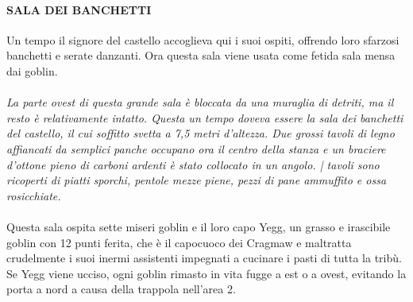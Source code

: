 \documentclass{article}
\begin{document}
\paragraph{SALA DEI BANCHETTI}
Un tempo il signore del castello accoglieva qui i suoi ospiti,
offrendo loro sfarzosi banchetti e serate danzanti. Ora questa
sala viene usata come fetida sala mensa dai goblin. \\
\\
\textit{La parte ovest di questa grande sala è bloccata da una muraglia
di detriti, ma il resto è relativamente intatto. Questa un tempo
doveva essere la sala dei banchetti del castello, il cui soffitto
svetta a 7,5 metri d’altezza. Due grossi tavoli di legno affiancati
da semplici panche occupano ora il centro della stanza e un
braciere d’ottone pieno di carboni ardenti è stato collocato
in un angolo. | tavoli sono ricoperti di piatti sporchi, pentole
mezze piene, pezzi di pane ammuffito e ossa rosicchiate.}\\
\\
Questa sala ospita sette miseri goblin e il loro capo Yegg,
un grasso e irascibile goblin con 12 punti ferita, che è il
capocuoco dei Cragmaw e maltratta crudelmente i suoi
inermi assistenti impegnati a cucinare i pasti di tutta la
tribù. Se Yegg viene ucciso, ogni goblin rimasto in vita
fugge a est o a ovest, evitando la porta a nord a causa della
trappola nell’area 2.
\end{document}
